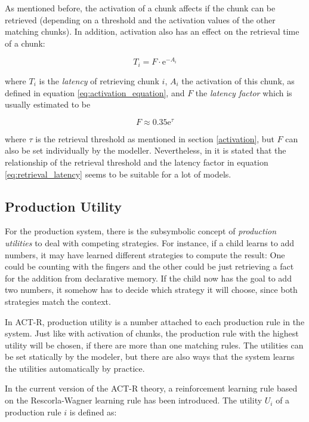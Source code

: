 As mentioned before, the activation of a chunk affects if the chunk can be retrieved (depending on a threshold and the activation values of the other matching chunks). In addition, activation also has an effect on the retrieval time of a chunk:

\begin{equation}
\label{eq:retrieval_latency}
T_i = F \cdot \mathrm{e}^{-A_i}
\end{equation}

where $T_i$ is the \emph{latency} of retrieving chunk $i$, $A_i$ the activation of this chunk, as defined in equation \eqref{eq:activation_equation}, and $F$ the \emph{latency factor} which is usually estimated to be

\begin{equation}
F \approx 0.35\mathrm{e}^\tau
\end{equation}

where $\tau$ is the retrieval threshold as mentioned in section \ref{activation}, but $F$ can also be set individually by the modeller. Nevertheless, in \cite[p. 1042]{anderson_integrated_2004} it is stated that the relationship of the retrieval threshold and the latency factor in equation \eqref{eq:retrieval_latency} seems to be suitable for a lot of models.

\subsection{Production Utility}

For the production system, there is the subsymbolic concept of \emph{production utilities} to deal with competing strategies. For instance, if a child learns to add numbers, it may have learned different strategies to compute the result: One could be counting with the fingers and the other could be just retrieving a fact for the addition from declarative memory. If the child now has the goal to add two numbers, it somehow has to decide which strategy it will choose, since both strategies match the context.

In ACT-R, production utility is a number attached to each production rule in the system. Just like with activation of chunks, the production rule with the highest utility will be chosen, if there are more than one matching rules. The utilities can be set statically by the modeler, but there are also ways that the system learns the utilities automatically by practice.

In the current version of the ACT-R theory, a reinforcement learning rule based on the Rescorla-Wagner learning rule \cite{rescorla_wagner_1972} has been introduced. The utility $U_i$ of a production rule $i$ is defined as:

